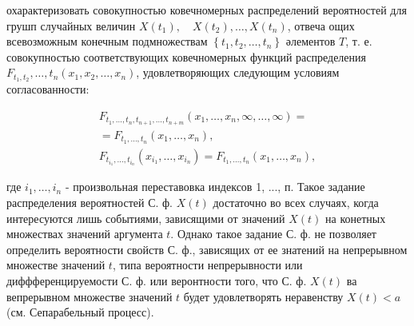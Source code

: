 \documentclass[10pt]{article}
\begin{document}
охарактеризовать совокупностью ковечномерных распределений вероятностей для грушп случайных величин $X\left(t_{1}\right), \quad X\left(t_{2}\right), \ldots, X\left(t_{n}\right)$, отвеча ощих всевозможным конечным подмножествам $\left\{t_{1}, t_{2}, \ldots, t_{n}\right\}$ әлементов $T$, т. е. совокупностью соответствующих ковечномерных функций распределения $F_{t_{1}, t_{2}}, \ldots, t_{n}\left(x_{1}, x_{2}, \ldots, x_{n}\right)$, удовлетворяющих следующим условиям согласованности:



\[

\begin{gathered}

F_{t_{1}, \ldots, t_{n}, t_{n+1}, \ldots, t_{n+m}}\left(x_{1}, \ldots, x_{n}, \infty, \ldots, \infty\right)= \\

=F_{t_{1}, \ldots, t_{n}}\left(x_{1}, \ldots, x_{n}\right), \\

F_{t_{i_{1}}, \ldots, t_{i_{n}}}\left(x_{i_{1}}, \ldots, x_{i_{n}}\right)=F_{t_{1}, \ldots, t_{n}}\left(x_{1}, \ldots, x_{n}\right),

\end{gathered}

\]



где $i_{1}, \ldots, i_{n}$ - произвольная переставовка индексов 1, ..., п. Такое задание распределения вероятностей С. ф. $X(t)$ достаточно во всех случаях, когда интересуются лишь событиями, зависящими от значений $X(t)$ на конетных множествах значений аргумента $t$. Однако такое задание С. ф. не позволяет определить вероятности свойств С. ф., зависящих от ее знатений на непрерывном множестве значений $t$, типа вероятности непрерывности или диффференцируемости С. ф. или веронтности того, что С. ф. $X(t)$ ва вепрерывном множестве значений $t$ будет удовлетворять неравенству $X(t)<a$ (см. Сепарабельный процесс).
\end{document}
